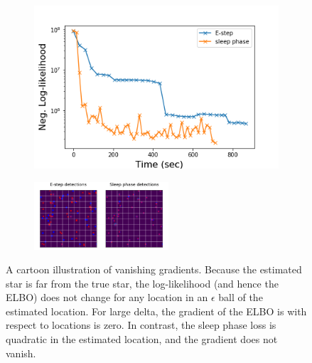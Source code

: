 \begin{figure}[!htb]
    \centering
    \begin{subfigure}[t]{0.3\textwidth}
    \centering
    \includegraphics[width=\textwidth]{figures/optim_path_compare_100x100.png}
    \end{subfigure}
    \begin{subfigure}[t]{0.69\textwidth}
    \centering
    \includegraphics[width=0.55\textwidth]{figures/optim_path_detect_compare_100x100.png}
    \end{subfigure}
    \vspace{-3em}
    \caption{A cartoon illustration of vanishing gradients. Because the estimated star is far from the true star, the log-likelihood (and hence the ELBO) does not change for any location in an $\epsilon$ ball of the estimated location. 
    For large delta, the gradient of the ELBO is with respect to locations is zero. In contrast, the sleep phase loss is quadratic in the estimated location, and the gradient does not vanish. }
    \label{fig:gradzero_cartoon}
\end{figure}
